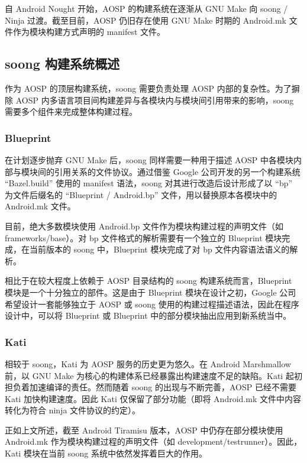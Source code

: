 自 Android Nought 开始，AOSP 的构建系统在逐渐从 GNU Make 向 soong / Ninja 过渡。截至目前，AOSP 仍旧存在使用 GNU Make 时期的 Android.mk 文件作为模块构建方式声明的 manifest 文件。

\subsection{soong 构建系统概述}

作为 AOSP 的顶层构建系统，soong 需要负责处理 AOSP 内部的复杂性。为了摒除 AOSP 内多语言项目间构建差异与各模块内与模块间引用带来的影响，soong 需要多个组件来完成整体构建过程。

\subsubsection{Blueprint}

在计划逐步抛弃 GNU Make 后，soong 同样需要一种用于描述 AOSP 中各模块内部与模块间的引用关系的文件协议。通过借鉴 Google 公司开发的另一个构建系统 “Bazel.build” 使用的 manifest 语法，soong 对其进行改造后设计形成了以 “bp” 为文件后缀名的 “Blueprint / Android.bp” 文件，用以替换原本各模块中的 Android.mk 文件。

目前，绝大多数模块使用 Android.bp 文件作为模块构建过程的声明文件（如 frameworks/base）。对 bp 文件格式的解析需要有一个独立的 Blueprint 模块完成，在当前版本的 soong 中，Blueprint 模块完成了对 bp 文件内容语法语义的解析。

相比于在较大程度上依赖于 AOSP 目录结构的 soong 构建系统而言，Blueprint 模块是一个十分独立的部件。这是由于 Blueprint 模块在设计之初，Google 公司希望设计一套能够独立于 AOSP 或 soong 使用的构建过程描述语法，因此在程序设计中，可以将 Blueprint 或 Blueprint 中的部分模块抽出应用到新系统当中。

\subsubsection{Kati}

相较于 soong，Kati 为 AOSP 服务的历史更为悠久。在 Android Marshmallow 前，以 GNU Make 为核心的构建体系已经暴露出构建速度不足的缺陷。Kati 起初担负着加速编译的责任。然而随着 soong 的出现与不断完善，AOSP 已经不需要 Kati 加快构建速度。因此 Kati 仅保留了部分功能（即将 Android.mk 文件中内容转化为符合 ninja 文件协议的约定）。

正如上文所述，截至 Android Tiramisu 版本，AOSP 中仍存在部分模块使用 Android.mk 作为模块构建过程的声明文件（如 development/testrunner）。因此，Kati 模块在当前 soong 系统中依然发挥着巨大的作用。


